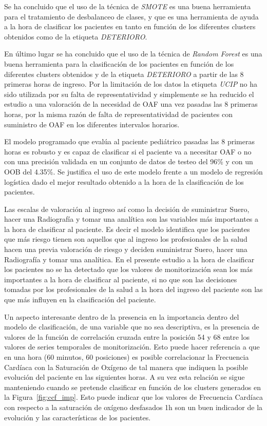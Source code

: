 Se ha concluido que el uso de la técnica de \textit{SMOTE} es una buena herramienta para el tratamiento de desbalanceo de clases, y que es una herramienta de ayuda a la hora de clasificar los pacientes en tanto en función de los diferentes clusters obtenidos como de la etiqueta \textit{DETERIORO}.

En último lugar se ha concluido que el uso de la técnica de \textit{Random Forest} es una buena herramienta para la clasificación de los pacientes en función de los diferentes clusters obtenidos y de la etiqueta \textit{DETERIORO} a partir de las 8 primeras horas de ingreso. Por la limitación de los datos la etiqueta \textit{UCIP} no ha sido utilizada por su falta de representatividad y simplemente se ha reducido el estudio a una valoración de la necesidad de OAF una vez pasadas las 8 primeras horas, por la misma razón de falta de representatividad de pacientes con suministro de OAF en los diferentes intervalos horarios.

El modelo programado que evalúa al paciente pediátrico pasadas las 8 primeras horas es robusto y es capaz de clasificar si el paciente va a necesitar OAF o no con una precisión validada en un conjunto de datos de testeo del 96\% y con un OOB del 4.35\%. Se justifica el uso de este modelo frente a un modelo de regresión logística dado el mejor resultado obtenido a la hora de la clasificación de los pacientes.

Las escalas de valoración al ingreso así como la decisión de suministrar Suero, hacer una Radiografía y tomar una analítica son las variables más importantes a la hora de clasificar al paciente. Es decir el modelo identifica que los pacientes que más riesgo tienen son aquellos que al ingreso los profesionales de la salud hacen una previa valoración de riesgo y deciden suministrar Suero, hacer una Radiografía y tomar una analítica. En el presente estudio a la hora de clasificar los pacientes no se ha detectado que los valores de monitorización sean los más importantes a la hora de clasificar al paciente, si no que son las decisiones tomadas por los profesionales de la salud a la hora del ingreso del paciente son las que más influyen en la clasificación del paciente.

Un aspecto interesante dentro de la presencia en la importancia dentro del modelo de clasificación, de una variable que no sea descriptiva, es la presencia de valores de la función de correlación cruzada entre la posición 54 y 68 entre los valores de series temporales de monitorización. Esto puede hacer referencia a que en una hora (60 minutos, 60 posiciones) es posible correlacionar la Frecuencia Cardíaca con la Saturación de Oxígeno de tal manera que indiquen la posible evolución del paciente en las siguientes horas. A su vez esta relación se sigue manteniendo cuando se pretende clasificar en función de los clusters generados en la Figura~\ref{fig:ccf_imp}. Esto puede indicar que los valores de Frecuencia Cardíaca con respecto a la saturación de oxígeno desfasados 1h son un buen indicador de la evolución y las características de los pacientes.

